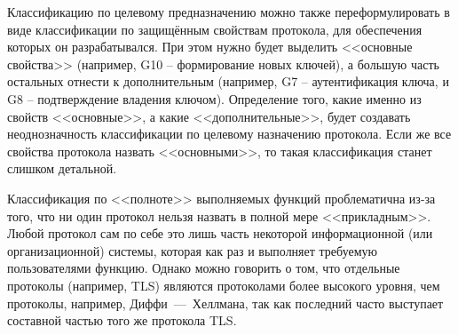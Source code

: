 Классификацию по целевому предназначению можно также переформулировать в виде классификации по защищённым свойствам протокола, для обеспечения которых он разрабатывался. При этом нужно будет выделить <<основные свойства>> (например, G10 -- формирование новых ключей), а большую часть остальных отнести к дополнительным (например, G7 -- аутентификация ключа, и G8 -- подтверждение владения ключом). Определение того, какие именно из свойств <<основные>>, а какие <<дополнительные>>, будет создавать неоднозначность классификации по целевому назначению протокола. Если же все свойства протокола назвать <<основными>>, то такая классификация станет слишком детальной.

Классификация по <<полноте>> выполняемых функций проблематична из-за того, что ни один протокол нельзя назвать в полной мере <<прикладным>>. Любой протокол сам по себе это лишь часть некоторой информационной (или организационной) системы, которая как раз и выполняет требуемую пользователями функцию. Однако можно говорить о том, что отдельные протоколы (например, TLS) являются протоколами более высокого уровня, чем протоколы, например, Диффи~---~Хеллмана, так как последний часто выступает составной частью того же протокола TLS.
